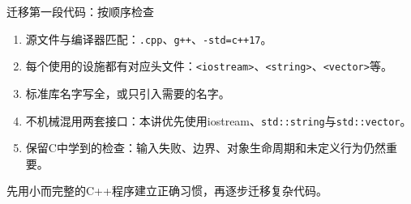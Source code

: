 \begin{frame}{迁移第一段代码：按顺序检查}
\begin{enumerate}
\item 源文件与编译器匹配：\texttt{.cpp}、\texttt{g++}、\texttt{-std=c++17}。
\item 每个使用的设施都有对应头文件：\texttt{<iostream>}、\texttt{<string>}、\texttt{<vector>}等。
\item 标准库名字写全，或只引入需要的名字。
\item 不机械混用两套接口：本讲优先使用iostream、\texttt{std::string}与\texttt{std::vector}。
\item 保留C中学到的检查：输入失败、边界、对象生命周期和未定义行为仍然重要。
\end{enumerate}
\medskip
\alert{先用小而完整的C++程序建立正确习惯，再逐步迁移复杂代码。}
\end{frame}
